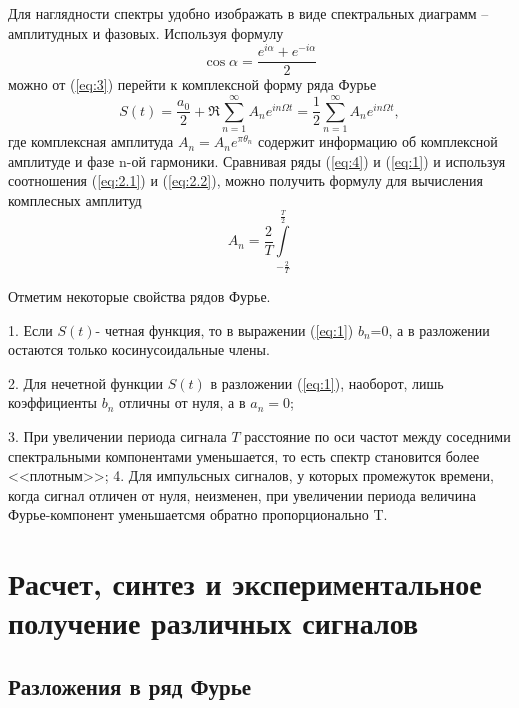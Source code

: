  Для наглядности спектры удобно изображать в виде спектральных диаграмм -- амплитудных и фазовых.
 Используя формулу
 \begin{equation}
 	\cos\alpha=\frac{e^{i\alpha}+e^{-i\alpha}}{2}
 \end{equation}
 можно от (\ref{eq:3}) перейти к комплексной форму ряда Фурье
 \begin{equation}
 	\label{eq:4}
 	S(t)=\frac{a_0}{2}+\Re\sum_{n=1}^{\infty}A_ne^{in\Omega t}=\frac{1}{2}\sum_{n=1}^{\infty}A_ne^{in\Omega t}, %
 \end{equation}
 где комплексная амплитуда $A_n=A_ne^{\pi\theta_n}$ содержит информацию об комплексной амплитуде и фазе n-ой гармоники. Сравнивая ряды (\ref{eq:4}) и (\ref{eq:1}) и используя соотношения (\ref{eq:2.1}) и (\ref{eq:2.2}), можно получить формулу для вычисления комплесных амплитуд
 \begin{equation}
 	A_n=\frac{2}{T}\int\limits_{-\frac{2}{T}}^{\frac{T}{2}}
 \end{equation}

 Отметим некоторые свойства рядов Фурье.

 1. Если $S(t)$- четная функция, то в выражении (\ref{eq:1}) $b_n$=0, а в разложении остаются только косинусоидальные члены.

 2. Для нечетной функции $S(t)$ в разложении (\ref{eq:1}), наоборот, лишь коэффициенты $b_n$ отличны от нуля, а в $a_n=0$;

 3. При увеличении периода сигнала $T$ расстояние по оси частот между соседними спектральными компонентами уменьшается, то есть спектр становится более <<плотным>>;
 4. Для импульсных сигналов, у которых промежуток времени, когда сигнал отличен от нуля, неизменен, при увеличении периода величина Фурье-компонент уменьшаетсмя обратно пропорционально T.

\newpage
\section{Расчет, синтез и экспериментальное получение различных сигналов}
\subsection{Разложения в ряд Фурье}
